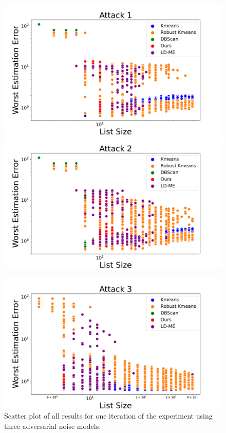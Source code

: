 \begin{figure}[t]
    \centering
    \begin{minipage}[t]{\linewidth}
        \includegraphics[width=0.4\linewidth]
        {chapters/robust/figures/gauss_inliers_adv_circle_scatter.pdf}
        \includegraphics[width=0.4\linewidth]{chapters/robust/figures/gauss_inliers_adv_line_scatter.pdf}
    \end{minipage}
    \begin{minipage}[t]{\linewidth}
        \centering
        \includegraphics[width=0.4\linewidth]{chapters/robust/figures/gauss_inliers_gauss_noise_scatter.pdf}
    \end{minipage}
    \caption{Scatter plot of all results for one iteration of the experiment using three adversarial noise models.}
    \label{fig:scatter_plots}
\end{figure}

